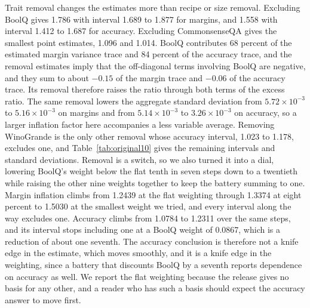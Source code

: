 Trait removal changes the estimates more than recipe or size removal. Excluding BoolQ gives 1.786 with interval 1.689 to 1.877 for margins, and 1.558 with interval 1.412 to 1.687 for accuracy. Excluding CommonsenseQA gives the smallest point estimates, 1.096 and 1.014. BoolQ contributes 68 percent of the estimated margin variance trace and 84 percent of the accuracy trace, and the removal estimates imply that the off-diagonal terms involving BoolQ are negative, and they sum to about $-0.15$ of the margin trace and $-0.06$ of the accuracy trace. Its removal therefore raises the ratio through both terms of the excess ratio. The same removal lowers the aggregate standard deviation from $5.72\times10^{-3}$ to $5.16\times10^{-3}$ on margins and from $5.14\times10^{-3}$ to $3.26\times10^{-3}$ on accuracy, so a larger inflation factor here accompanies a less variable average. Removing WinoGrande is the only other removal whose accuracy interval, 1.023 to 1.178, excludes one, and Table~\ref{tab:original10} gives the remaining intervals and standard deviations. Removal is a switch, so we also turned it into a dial, lowering BoolQ's weight below the flat tenth in seven steps down to a twentieth while raising the other nine weights together to keep the battery summing to one. Margin inflation climbs from 1.2439 at the flat weighting through 1.3374 at eight percent to 1.5030 at the smallest weight we tried, and every interval along the way excludes one. Accuracy climbs from 1.0784 to 1.2311 over the same steps, and its interval stops including one at a BoolQ weight of 0.0867, which is a reduction of about one seventh. The accuracy conclusion is therefore not a knife edge in the estimate, which moves smoothly, and it is a knife edge in the weighting, since a battery that discounts BoolQ by a seventh reports dependence on accuracy as well. We report the flat weighting because the release gives no basis for any other, and a reader who has such a basis should expect the accuracy answer to move first.

